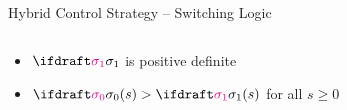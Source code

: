 \documentclass[notheorems, aspectratio=169, presentation]{beamer}
\begin{document}


\newcommand{\minipageheight}{6in}
\begin{frame}[t]{Hybrid Control Strategy -- Switching Logic}
  \VonedotDefinition
  \pause

  \begin{minipage}[t][\minipageheight][t]{\linewidth}
  \begin{columns}
    \begin{column}[T]{0.5\textwidth}
      {\large{}}\smallskip

      \begin{itemize}[<+->]
        \item
          $\sigmaone$ is positive definite
        \item 
        $\sigmazero(s) > \sigmaone(s)$ for all $s \geq 0$ 
      \end{itemize}%

    \end{column}
    \begin{column}[T]{0.5\textwidth}
      \vspace{-9pt}
        \begin{center}
        \end{center}
    \end{column}
  \end{columns}
  \end{minipage}
\end{frame}
\end{document}

